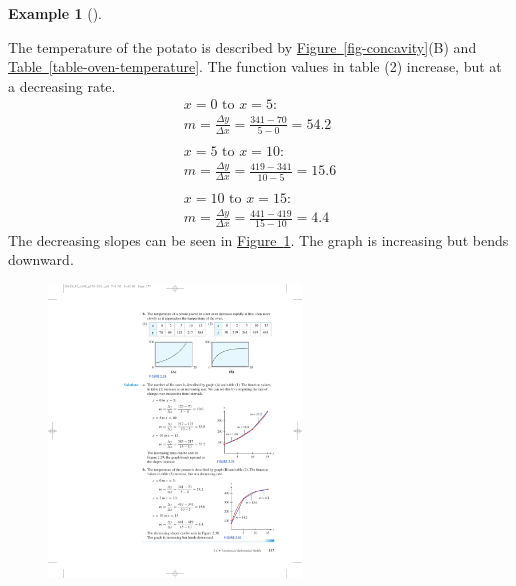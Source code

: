 \documentclass[10pt,]{book}
\theoremstyle{plain}
\theoremstyle{definition}
\theoremstyle{definition}
\theoremstyle{definition}
\newtheorem{example}[theorem]{Example}
\theoremstyle{definition}
\theoremstyle{definition}
\numberwithin{equation}{section}
\begin{document}
\begin{example}[]
\begin{enumerate}[label=*\alph**]
            The temperature of the potato is described by \hyperref[fig-concavity]{Figure~\ref{fig-concavity}}(B) and \hyperref[table-oven-temperature]{Table~\ref{table-oven-temperature}}. The function values in table (2) increase, but at a decreasing rate.
            \begin{gather*}
x = 0\text { to } x = 5:\\
m =\frac{\Delta y}{\Delta x}=\frac{341−70}{5 − 0}= 54.2\\
\\
x = 5 \text{ to } x = 10:\\
m =\frac{\Delta y}{\Delta x}=\frac{419 − 341}{10 − 5}= 15.6\\
\\
x = 10 \text{ to } x = 15:\\
m =\frac{\Delta y}{\Delta x}=\frac{441 − 419}{15 − 10}= 4.4
\end{gather*}
        The decreasing slopes can be seen in \hyperref[fig-concave-down]{Figure~\ref{fig-concave-down}}. The graph is increasing but bends downward.
        \leavevmode%
\begin{figure}
\centering
\includegraphics[width=0.60\textwidth,]{images/fig-concave-down.pdf}\caption{\label{fig-concave-down}}
\end{figure}
\end{enumerate}
\end{example}
\end{document}
